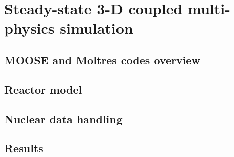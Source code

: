 \chapter[Steady-state 3-D coupled multi-physics \,\,\,\, simulation]{Steady-state 3-D coupled multi-physics simulation}

\section{MOOSE and Moltres codes overview}

\section{Reactor model}

\section{Nuclear data handling}

\section{Results}